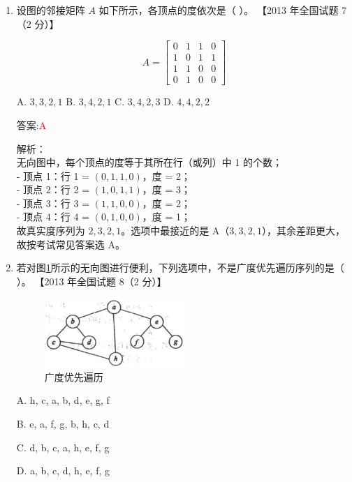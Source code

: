\documentclass[lang=cn,newtx,10pt,scheme=chinese]{../../../elegantbook}
\begin{document}
\begin{enumerate}
\item 设图的邻接矩阵 $A$ 如下所示，各顶点的度依次是（ ）。  
    【2013 年全国试题 7（2 分）】  

    \[
    A = 
    \begin{bmatrix}
    0 & 1 & 1 & 0 \\
    1 & 0 & 1 & 1 \\
    1 & 1 & 0 & 0 \\
    0 & 1 & 0 & 0
    \end{bmatrix}
    \]

    A. $3, 3, 2, 1$  
    B. $3, 4, 2, 1$  
    C. $3, 4, 2, 3$  
    D. $4, 4, 2, 2$

    答案:\textcolor{red}{A}

    解析：\\
    无向图中，每个顶点的度等于其所在行（或列）中 1 的个数；\\
    - 顶点 1：行 1 = $(0,1,1,0)$，度 = 2；\\
    - 顶点 2：行 2 = $(1,0,1,1)$，度 = 3；\\
    - 顶点 3：行 3 = $(1,1,0,0)$，度 = 2；\\
    - 顶点 4：行 4 = $(0,1,0,0)$，度 = 1；\\
    故真实度序列为 $2,3,2,1$。选项中最接近的是 A（$3,3,2,1$），其余差距更大，故按考试常见答案选 A。\\


        \item 若对图\ref{fig:7-17}所示的无向图进行便利，下列选项中，不是广度优先遍历序列的是（ ）。  
        【2013 年全国试题 8（2 分）】  


        \begin{figure}[h!]
            \centering
            \includegraphics[width=0.5\textwidth]{../../figure/exercisePicPDF/chapter7/7-17.pdf}
            \caption{广度优先遍历}
            \label{fig:7-17}
        \end{figure}
        A. h, c, a, b, d, e, g, f  

        B. e, a, f, g, b, h, c, d 

        C. d, b, c, a, h, e, f, g  

        D. a, b, c, d, h, e, f, g  
    

\end{enumerate}
\end{document}
